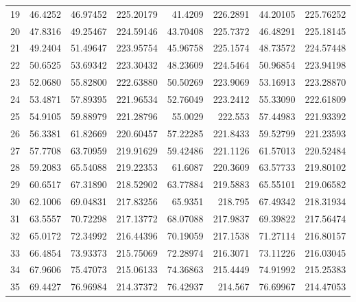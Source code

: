 \begin{table}[ht!]
{\begin{tabular}{@{}rrrrrrrr@{}}
19 & 46.4252 & 46.97452 & 225.20179 & 41.4209  & 226.2891 & 44.20105 & 225.76252 \\
20 & 47.8316 & 49.25467 & 224.59146 & 43.70408 & 225.7372 & 46.48291 & 225.18145 \\
21 & 49.2404 & 51.49647 & 223.95754 & 45.96758 & 225.1574 & 48.73572 & 224.57448 \\
22 & 50.6525 & 53.69342 & 223.30432 & 48.23609 & 224.5464 & 50.96854 & 223.94198 \\
23 & 52.0680 & 55.82800 & 222.63880 & 50.50269 & 223.9069 & 53.16913 & 223.28870 \\
24 & 53.4871 & 57.89395 & 221.96534 & 52.76049 & 223.2412 & 55.33090 & 222.61809 \\
25 & 54.9105 & 59.88979 & 221.28796 & 55.0029  & 222.553  & 57.44983 & 221.93392 \\
26 & 56.3381 & 61.82669 & 220.60457 & 57.22285 & 221.8433 & 59.52799 & 221.23593 \\
27 & 57.7708 & 63.70959 & 219.91629 & 59.42486 & 221.1126 & 61.57013 & 220.52484 \\
28 & 59.2083 & 65.54088 & 219.22353 & 61.6087  & 220.3609 & 63.57733 & 219.80102 \\
29 & 60.6517 & 67.31890 & 218.52902 & 63.77884 & 219.5883 & 65.55101 & 219.06582 \\
30 & 62.1006 & 69.04831 & 217.83256 & 65.9351  & 218.795  & 67.49342 & 218.31934 \\
31 & 63.5557 & 70.72298 & 217.13772 & 68.07088 & 217.9837 & 69.39822 & 217.56474 \\
32 & 65.0172 & 72.34992 & 216.44396 & 70.19059 & 217.1538 & 71.27114 & 216.80157 \\
33 & 66.4854 & 73.93373 & 215.75069 & 72.28974 & 216.3071 & 73.11226 & 216.03045 \\
34 & 67.9606 & 75.47073 & 215.06133 & 74.36863 & 215.4449 & 74.91992 & 215.25383 \\
35 & 69.4427 & 76.96984 & 214.37372 & 76.42937 & 214.567  & 76.69967 & 214.47053 \\ \bottomrule
\end{tabular}%
}
\end{table}
\vfill
\clearpage

